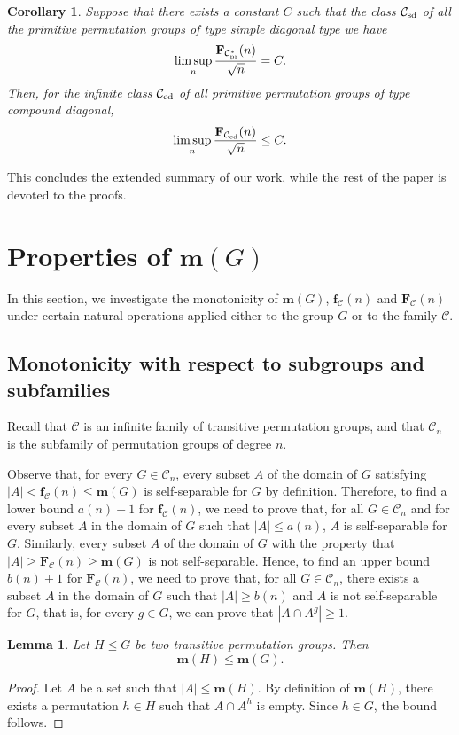 \documentclass[a4paper]{amsart}
\newcommand{\f}{\mathbf{f}}
\newcommand{\F}{\mathbf{F}}
\newcommand{\m}{\mathbf{m}}
\newcommand{\C}{\mathcal{C}}
\newtheorem{lemma}[theorem]{Lemma}
\newtheorem{corx}[thmx]{Corollary}
\theoremstyle{definition}
\begin{document}
\begin{corx}\label{cor:CD} Suppose that there exists a constant $C$ such that the class $\C_{\rm sd}$ of all the primitive permutation groups of type simple diagonal type we have \[ \limsup_n \frac{\F_{\C_{{\rm pr}}^\ast}(n)}{\sqrt{n}} = C.\]
    Then, for the infinite class $\C_{\rm cd}$ of all primitive permutation groups of type compound diagonal,
    \[ \limsup_n \frac{\F_{\C_{\rm cd}}(n)}{\sqrt{n}} \le C .\]
\end{corx} 

This concludes the extended summary of our work, while the rest of the paper is devoted to the proofs. 


\section{Properties of $\m(G)$}
In this section, we investigate the monotonicity of $\m(G)$, $\f_\C(n)$ and $\F_\C(n)$ under certain natural operations applied either to the group $G$ or to the family $\C$.

\subsection{Monotonicity with respect to subgroups and subfamilies}
Recall that $\C$ is an infinite family of transitive permutation groups, and that $\C_n$ is the subfamily of permutation groups of degree $n$.

Observe that, for every $G\in \C_n$, every subset $A$ of the domain of $G$ satisfying $\vert A \vert < \f_{\C}(n)\leq \m(G)$ is self-separable for $G$ by definition. Therefore, to find a lower bound 
$a(n)+1$ for $\f_{\C}(n)$, we need to prove that, for all $G\in \C_n$ and for every subset $A$ in the domain of $G$ such that $\vert A\vert\leq a(n)$, $A$ is self-separable for $G$. Similarly, every subset $A$ of the domain of $G$ with the property that $|A| \ge \F_{\C}(n) \ge \m(G)$ is not self-separable. Hence, to find an upper bound $b(n)+1$ for $\F_{\C}(n)$, we need to prove that, for all $G\in \C_n$, there exists a subset $A$ in the domain of $G$ such that $\vert A\vert\geq b(n)$ and $A$ is not self-separable for $G$, that is, for every $g\in G$, we can prove that $|A\cap A^g| \ge 1$.


\begin{lemma}\label{lemma:subgroup}
    Let $H\leq G$ be two transitive permutation groups. Then
    \[\m(H) \leq \m(G) .\]
\end{lemma}
\begin{proof}
    Let $A$ be a set such that $\vert A\vert \leq \m(H)$. By definition of $\m(H)$, there exists a permutation $h \in H$ such that $A\cap A^h$ is empty. Since $h \in G$, the bound follows.
\end{proof}
\end{document}
